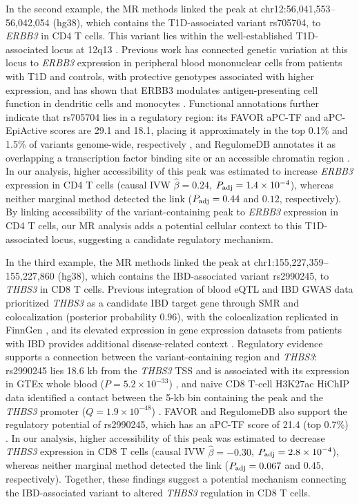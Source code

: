 \noindent In the second example, the MR methods linked the peak at chr12:56,041,553--56,042,054 (hg38), which contains the T1D-associated variant rs705704, to \textit{ERBB3} in CD4 T cells. This variant lies within the well-established T1D-associated locus at 12q13 \cite{todd2007t1d,hakonarson2008t1d}. Previous work has connected genetic variation at this locus to \textit{ERBB3} expression in peripheral blood mononuclear cells from patients with T1D and controls, with protective genotypes associated with higher expression, and has shown that ERBB3 modulates antigen-presenting cell function in dendritic cells and monocytes \cite{wang2010erbb3}. Functional annotations further indicate that rs705704 lies in a regulatory region: its FAVOR aPC-TF and aPC-EpiActive scores are 29.1 and 18.1, placing it approximately in the top 0.1\% and 1.5\% of variants genome-wide, respectively \cite{zhou2023favor}, and RegulomeDB annotates it as overlapping a transcription factor binding site or an accessible chromatin region \cite{boyle2012regulomedb,dong2023regulomedb}. In our analysis, higher accessibility of this peak was estimated to increase \textit{ERBB3} expression in CD4 T cells (causal IVW \(\hat{\beta}=0.24\), \(P_{\mathrm{adj}}=1.4\times10^{-4}\)), whereas neither marginal method detected the link (\(P_{\mathrm{adj}}=0.44\) and \(0.12\), respectively). By linking accessibility of the variant-containing peak to \textit{ERBB3} expression in CD4 T cells, our MR analysis adds a potential cellular context to this T1D-associated locus, suggesting a candidate regulatory mechanism.

\noindent In the third example, the MR methods linked the peak at chr1:155,227,359--155,227,860 (hg38), which contains the IBD-associated variant rs2990245, to \textit{THBS3} in CD8 T cells. Previous integration of blood eQTL and IBD GWAS data prioritized \textit{THBS3} as a candidate IBD target gene through SMR and colocalization (posterior probability $0.96$), with the colocalization replicated in FinnGen \cite{gu2025ibd}, and its elevated expression in gene expression datasets from patients with IBD provides additional disease-related context \cite{zhang2025thbs3}. Regulatory evidence supports a connection between the variant-containing region and \textit{THBS3}: rs2990245 lies 18.6 kb from the \textit{THBS3} TSS and is associated with its expression in GTEx whole blood ($P=5.2\times10^{-33}$) \cite{gtex2017genetic}, and naive CD8 T-cell H3K27ac HiChIP data identified a contact between the 5-kb bin containing the peak and the \textit{THBS3} promoter ($Q=1.9\times10^{-48}$) \cite{chandra2021pieqtl}. FAVOR and RegulomeDB also support the regulatory potential of rs2990245, which has an aPC-TF score of 21.4 (top 0.7\%) \cite{zhou2023favor,boyle2012regulomedb}. In our analysis, higher accessibility of this peak was estimated to decrease \textit{THBS3} expression in CD8 T cells (causal IVW \(\hat{\beta}=-0.30\), \(P_{\mathrm{adj}}=2.8\times10^{-4}\)), whereas neither marginal method detected the link (\(P_{\mathrm{adj}}=0.067\) and \(0.45\), respectively). Together, these findings suggest a potential mechanism connecting the IBD-associated variant to altered \textit{THBS3} regulation in CD8 T cells.


